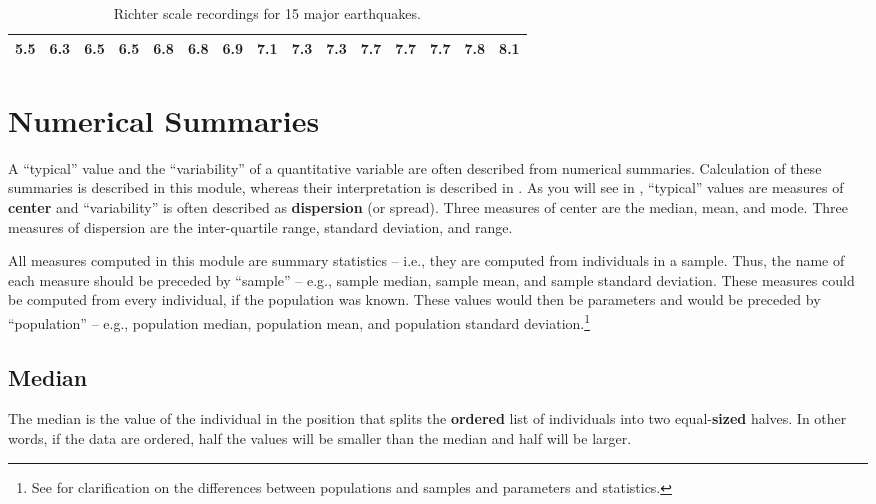 \documentclass[10pt,openany]{book}\usepackage[]{graphicx}\usepackage[]{color}
\begin{document}
\begin{table}[ht]
\centering
\caption{Richter scale recordings for 15 major earthquakes.} 
\label{tab:EQData}
\begin{tabular}{rrrrrrrrrrrrrrr}
   \hline
5.5 & 6.3 & 6.5 & 6.5 & 6.8 & 6.8 & 6.9 & 7.1 & 7.3 & 7.3 & 7.7 & 7.7 & 7.7 & 7.8 & 8.1 \\ 
   \hline
\end{tabular}
\end{table}



\section{Numerical Summaries} \label{sec:quEDACenter}
A ``typical'' value and the ``variability'' of a quantitative variable are often described from numerical summaries. Calculation of these summaries is described in this module, whereas their interpretation is described in . As you will see in , ``typical'' values are measures of \textbf{center} and ``variability'' is often described as \textbf{dispersion} (or spread). Three measures of center are the median, mean, and mode. Three measures of dispersion are the inter-quartile range, standard deviation, and range.

All measures computed in this module are summary statistics -- i.e., they are computed from individuals in a sample. Thus, the name of each measure should be preceded by ``sample'' -- e.g., sample median, sample mean, and sample standard deviation. These measures could be computed from every individual, if the population was known. These values would then be parameters and would be preceded by ``population'' -- e.g., population median, population mean, and population standard deviation.\footnote{See  for clarification on the differences between populations and samples and parameters and statistics.}


\subsection{Median} \label{sec:Median}
The median is the value of the individual in the position that splits the \textbf{ordered} list of individuals into two equal-\textbf{sized} halves. In other words, if the data are ordered, half the values will be smaller than the median and half will be larger.
\end{document}
